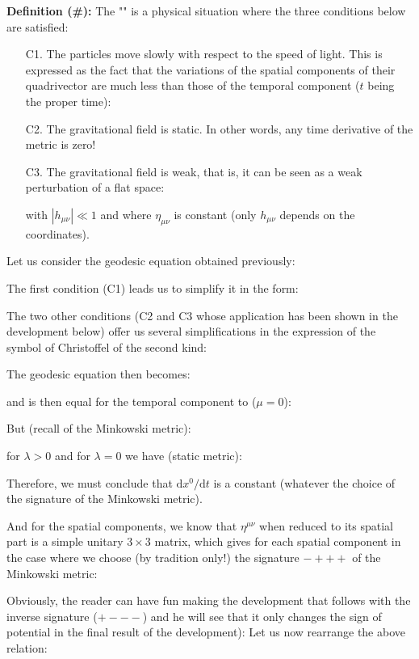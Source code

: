 	\textbf{Definition (\#\mydef):}  The "" is a physical situation where the three conditions below are satisfied:
	\begin{enumerate}
		\item[C1.] The particles move slowly with respect to the speed of light. This is expressed as the fact that the variations of the spatial components of their quadrivector are much less than those of the temporal component ($t$ being the proper time):
		

		\item[C2.] The gravitational field is static. In other words, any time derivative of the metric is zero!

		\item[C3.] The gravitational field is weak, that is, it can be seen as a weak perturbation of a flat space:
		
		with $|h_{\mu\nu}|\ll 1$ and where $\eta_{\mu\nu}$ is constant (only $h_{\mu\nu}$ depends on the coordinates).
	\end{enumerate}
	Let us consider the geodesic equation obtained previously:
	
	The first condition (C1) leads us to simplify it in the form:
	
	The two other conditions (C2 and C3 whose application has been shown in the development below) offer us several simplifications in the expression of the symbol of Christoffel of the second kind:
	
	The geodesic equation then becomes:
	
	and is then equal for the temporal component to ($\mu=0$):
	
	But (recall of the Minkowski metric):
	
	for $\lambda>0$ and for $\lambda=0$ we have (static metric):
	
	Therefore, we must conclude that $\mathrm{d}x^0/\mathrm{d}t$ is a constant (whatever the choice of the signature of the Minkowski metric).

	And for the spatial components, we know that $\eta^{\mu\nu}$ when reduced to its spatial part is a simple unitary $3\times 3$ matrix, which gives for each spatial component in the case where we choose (by tradition only!) the signature $- + + +$ of the Minkowski metric:
	
	Obviously, the reader can have fun making the development that follows with the inverse signature ($+ - - -$) and he will see that it only changes the sign of potential in the final result of the development):
	Let us now rearrange the above relation:
	
